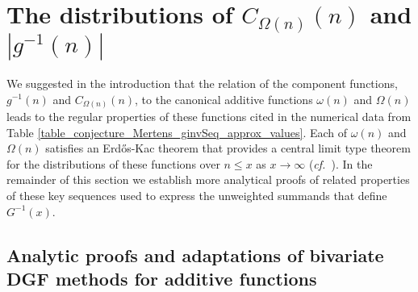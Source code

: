 \documentclass[11pt,reqno,a4letter]{article}
\numberwithin{figure}{section}
\numberwithin{table}{section}
\newcommand{\cf}{\textit{cf.\ }}
\theoremstyle{plain}
\numberwithin{theorem}{section}
\theoremstyle{definition}
\begin{document}
\newpage
\section{The distributions of $C_{\Omega(n)}(n)$ and $|g^{-1}(n)|$} 
\label{Section_NewFormulasForgInvn} 

We suggested in the introduction that the relation of the component 
functions, $g^{-1}(n)$ and $C_{\Omega(n)}(n)$, to the canonical additive functions 
$\omega(n)$ and $\Omega(n)$ leads to the regular properties of these functions 
cited in the numerical data from 
Table \ref{table_conjecture_Mertens_ginvSeq_approx_values}. 
Each of $\omega(n)$ and $\Omega(n)$ satisfies 
an Erd\H{o}s-Kac theorem that provides a central limit type theorem for the 
distributions of these functions over $n \leq x$ as $x \rightarrow \infty$ 
\cite{ERDOS-KAC-REF,BILLINGSLY-CLT-PRIMEDIVFUNC,RENYI-TURAN} 
(\cf \cite{CLT-RANDOM-ORDERED-FACTS-2011}). 
In the remainder of this section we establish more analytical proofs of 
related properties of these key sequences used to express the unweighted summands that define 
$G^{-1}(x)$. 

\subsection{Analytic proofs and adaptations of bivariate DGF methods for additive functions} 
\end{document}
